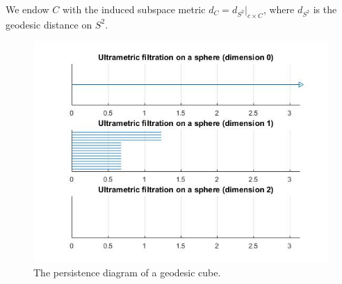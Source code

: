 \documentclass[a4paper,12pt,reqno, english]{amsart}
\theoremstyle{plain}
\theoremstyle{definition}
\begin{document}
{{We endow $C$ with the induced subspace metric $d_C= d_{S^2}|_{c\times C}$, where $d_{S^2}$ is the geodesic distance on $S^2$.

\begin{figure}
	\includegraphics[scale=0.7]{DiagramUlt3Cube.jpg}
    \caption{The persistence diagram of a geodesic cube. }
\end{figure}

}}
\end{document}
